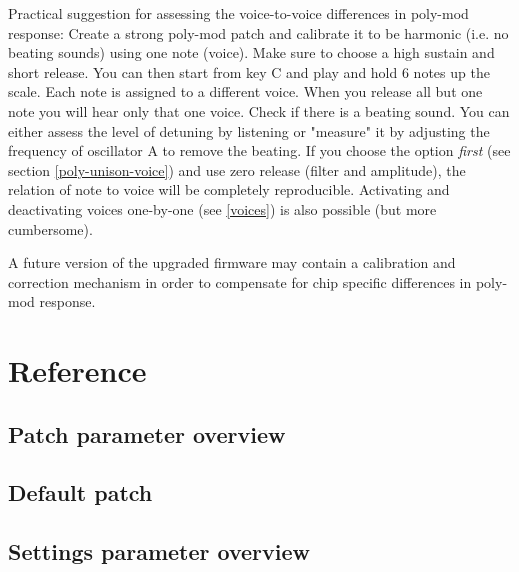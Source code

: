 \documentclass[landscape, 11pt, oneside, twoside]{report}
\newenvironment{flowtext}{\addmargin[0cm]{0cm}}{\endaddmargin} %
\begin{document}
\begin{flowtext}
Practical suggestion for assessing the voice-to-voice differences in poly-mod response: Create a strong poly-mod patch and calibrate it to be harmonic (i.e. no beating sounds) using one note (voice). Make sure to choose a high sustain and short release. You can then start from key C and play and hold 6 notes up the scale. Each note is assigned to a different voice. When you release all but one note you will hear only that one voice. Check if there is a beating sound. You can either assess the level of detuning by listening or "measure" it by adjusting the frequency of oscillator A to remove the beating. If you choose the \assign option \textit{first} (see section \ref{poly-unison-voice}) and use zero release (filter and amplitude), the relation of note to voice will be completely reproducible. Activating and deactivating voices one-by-one (see \ref{voices}) is also possible (but more cumbersome).

A future version of the upgraded firmware may contain a calibration and correction mechanism in order to compensate for chip specific differences in poly-mod response.  

\end{flowtext}

\pagebreak
\chapter{Reference}

\begin{flowtext}

\section{Patch parameter overview}\label{patchref}



\pagebreak
\section{Default patch}\label{defaultpatch}



\pagebreak
\section{Settings parameter overview}\label{settingsref}



\end{flowtext}
\end{document}
